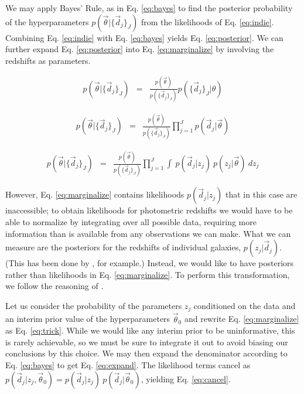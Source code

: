 \documentclass[12pt, onecolumn]{emulateapj}
\begin{document}
We may apply Bayes' Rule, as in Eq. \ref{eq:bayes} to find the posterior probability of the hyperparameters $p(\vec{\theta}|\{\vec{d}_{j}\}_{J})$ from the likelihoods of Eq. \ref{eq:indie}.  Combining Eq. \ref{eq:indie} with Eq. \ref{eq:bayes} yields Eq. \ref{eq:posterior}.  We can further expand Eq. \ref{eq:posterior} into Eq. \ref{eq:marginalize} by involving the redshifts as parameters.

\begin{eqnarray}
\label{eq:bayes}
p(\vec{\theta}|\{\vec{d}_{j}\}_{J}) &=& \frac{p(\vec{\theta})}{p(\{\vec{d}_{j}\}_{J})}p(\{\vec{d}_{j}\}_{J}|\theta)
\end{eqnarray}

\begin{eqnarray}
\label{eq:posterior}
p(\vec{\theta}|\{\vec{d}_{j}\}_{J}) &=& \frac{p(\vec{\theta})}{p(\{\vec{d}_{j}\}_{J})}\prod_{j=1}^{J}p(\vec{d}_{j}|\vec{\theta})
\end{eqnarray}

\begin{eqnarray}
\label{eq:marginalize}
p(\vec{\theta}|\{\vec{d}_{j}\}_{J}) &=& \frac{p(\vec{\theta})}{p(\{\vec{d}_{j}\}_{J})}\prod_{j=1}^{J}\int\ p(\vec{d}_{j}|z_{j})\ p(z_{j}|\vec{\theta})\ dz_{j}
\end{eqnarray}

However, Eq. \ref{eq:marginalize} contains likelihoods $p(\vec{d}_{j}|z_{j})$ that in this case are inaccessible; to obtain likelihoods for photometric redshifts we would have to be able to normalize by integrating over all possible data, requiring more information than is available from any observations we can make.  What we can measure are the posteriors for the redshifts of individual galaxies, $p(z_{j}|\vec{d}_{j})$.  (This has been done by \citet{she11}, for example.)  Instead, we would like to have posteriors rather than likelihoods in Eq. \ref{eq:marginalize}.  To perform this transformation, we follow the reasoning of \citet{mar15}.  

Let us consider the probability of the parameters $z_{j}$ conditioned on the data and an interim prior value of the hyperparameters $\vec{\theta}_{0}$ and rewrite Eq. \ref{eq:marginalize} as Eq. \ref{eq:trick}.  While we would like any interim prior to be uninformative, this is rarely achievable, so we must be sure to integrate it out to avoid biasing our conclusions by this choice.  We may then expand the denominator according to Eq. \ref{eq:bayes} to get Eq. \ref{eq:expand}.  The likelihood terms cancel as $p(\vec{d}_{j}|z_{j},\vec{\theta}_{0})=p(\vec{d}_{j}|z_{j})\ p(\vec{d}_{j}|\vec{\theta}_{0})$, yielding Eq. \ref{eq:cancel}.
\end{document}
